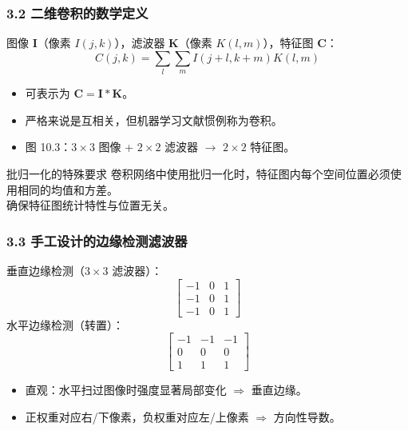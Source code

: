 \documentclass[t,aspectratio=169]{beamer} %
\begin{document}
\begin{frame}
    \frametitle{3.2 二维卷积的数学定义}
    图像 $\mathbf{I}$（像素 $I(j,k)$），滤波器 $\mathbf{K}$（像素 $K(l,m)$），特征图 $\mathbf{C}$：
    \begin{equation}
        C(j, k) = \sum_l \sum_m I(j + l, k + m)K(l, m)
        \tag{10.2}
    \end{equation}
    \begin{itemize}
        \item 可表示为 $\mathbf{C} = \mathbf{I} * \mathbf{K}$。
        \item 严格来说是\alert{互相关}，但机器学习文献惯例称为卷积。
        \item 图 10.3：$3 \times 3$ 图像 + $2 \times 2$ 滤波器 $\to$ $2 \times 2$ 特征图。
    \end{itemize}
    \begin{block}{批归一化的特殊要求}
        卷积网络中使用批归一化时，\alert{特征图内每个空间位置}必须使用相同的均值和方差。\\
        确保特征图统计特性\alert{与位置无关}。
    \end{block}
\end{frame}

\begin{frame}
    \frametitle{3.3 手工设计的边缘检测滤波器}
    垂直边缘检测（$3 \times 3$ 滤波器）：
    \begin{equation}
        \begin{bmatrix} -1 & 0 & 1 \\ -1 & 0 & 1 \\ -1 & 0 & 1 \end{bmatrix}
        \tag{10.3}
    \end{equation}
    水平边缘检测（转置）：
    \begin{equation}
        \begin{bmatrix} -1 & -1 & -1 \\ 0 & 0 & 0 \\ 1 & 1 & 1 \end{bmatrix}
        \tag{10.4}
    \end{equation}
    \begin{itemize}
        \item 直观：水平扫过图像时强度显著局部变化 $\Rightarrow$ 垂直边缘。
        \item 正权重对应右/下像素，负权重对应左/上像素 $\Rightarrow$ 方向性导数。
    \end{itemize}
\end{frame}
\end{document}
